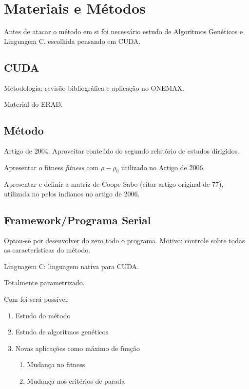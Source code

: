 \chapter{Materiais e Métodos\label{cap:metodologia}}

Antes de atacar o método em si foi necessário estudo de Algoritmos Genéticos e Linguagem C, escolhida pensando em CUDA.

\section{CUDA}

Metodologia: revisão bibliográfica e aplicação no ONEMAX.

Material do ERAD.

\section{Método\label{sec:metodo}}

	Artigo de 2004.	Aproveitar conteúdo do segundo relatório de estudos dirigidos.

	Apresentar o fitness \textit{fitness} com $\rho - \rho_0$ utilizado no Artigo de 2006.

	Apresentar e definir a matriz de Coope-Sabo (citar artigo original de 77), utilizada no pelos indianos no artigo de 2006.
	
\section{Framework/Programa Serial}

	Optou-se por desenvolver do zero todo o programa. Motivo: controle sobre todas as características do método.

	Linguagem C: linguagem nativa para CUDA.

	Totalmente parametrizado. 

	Com foi será possível:

	\begin{enumerate}
		\item Estudo do método 
		\item Estudo de algoritmos genéticos
		\item Novas aplicações como máximo de função
		\begin{enumerate}
			\item Mudança no fitness 
			\item Mudança nos critérios de parada
		\end{enumerate}	
	\end{enumerate}



